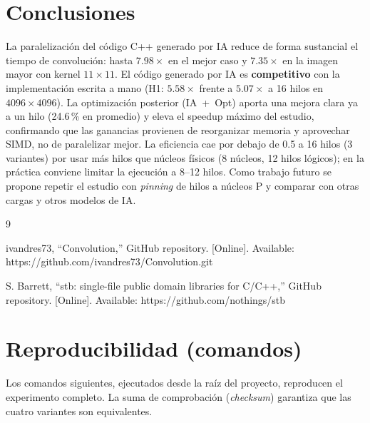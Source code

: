\documentclass[12pt]{article}
\begin{document}
\section{Conclusiones}
\label{sec:conclusiones}

La paralelización del código C++ generado por IA reduce de forma sustancial el
tiempo de convolución: hasta $7.98\times$ en el mejor caso y $7.35\times$ en la
imagen mayor con kernel $11\times11$. El código generado por IA es
\textbf{competitivo} con la implementación escrita a mano (H1: $5.58\times$ frente
a $5.07\times$ a 16 hilos en $4096\times4096$). La optimización posterior
(IA~+~Opt) aporta una mejora clara ya a un hilo (24.6\,\% en promedio) y eleva el
speedup máximo del estudio, confirmando que las ganancias provienen de
reorganizar memoria y aprovechar SIMD, no de paralelizar mejor. La eficiencia cae
por debajo de 0.5 a 16 hilos (3 variantes) por usar más hilos que núcleos físicos
(8 núcleos, 12 hilos lógicos); en la práctica conviene limitar la ejecución a
8--12 hilos. Como trabajo futuro se propone repetir el estudio con
\emph{pinning} de hilos a núcleos P y comparar con otras cargas y otros modelos de
IA.


\begin{thebibliography}{9}
\small

 ivandres73, ``Convolution,'' GitHub repository. [Online].
Available: https://github.com/ivandres73/Convolution.git

 S. Barrett, ``stb: single-file public domain libraries for
C/C++,'' GitHub repository. [Online]. Available: https://github.com/nothings/stb

\end{thebibliography}

\appendix

\section{Reproducibilidad (comandos)}
\label{anexo:repro}

Los comandos siguientes, ejecutados desde la raíz del proyecto, reproducen el
experimento completo. La suma de comprobación (\emph{checksum}) garantiza que las
cuatro variantes son equivalentes.
\end{document}

